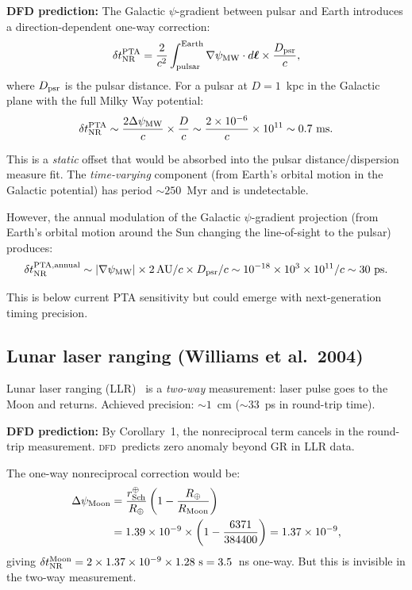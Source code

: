 \documentclass[aps,prl,twocolumn,superscriptaddress,showpacs]{revtex4-2}
\newcommand{\DFD}{\textsc{dfd}}
\newcommand{\Rearth}{R_\oplus}
\newcommand{\rSch}{r_{\rm Sch}}
\begin{document}
\textbf{DFD prediction:}  The Galactic $\psi$-gradient between
pulsar and Earth introduces a direction-dependent one-way correction:
\begin{equation}
\delta t_{\rm NR}^{\rm PTA} = \frac{2}{c^2}\int_{\rm pulsar}^{\rm Earth}
\nabla\psi_{\rm MW}\cdot d\boldsymbol{\ell}\times\frac{D_{\rm psr}}{c},
\end{equation}
where $D_{\rm psr}$ is the pulsar distance.  For a pulsar at
$D = 1$~kpc in the Galactic plane with the full Milky Way potential:
\begin{equation}
\delta t_{\rm NR}^{\rm PTA} \sim \frac{2\Delta\psi_{\rm MW}}{c}
\times \frac{D}{c} \sim \frac{2\times 10^{-6}}{c}\times 10^{11}
\sim 0.7~\text{ms}.
\end{equation}

This is a \emph{static} offset that would be absorbed into the
pulsar distance/dispersion measure fit.  The \emph{time-varying}
component (from Earth's orbital motion in the Galactic potential)
has period $\sim 250$~Myr and is undetectable.

However, the annual modulation of the Galactic $\psi$-gradient
projection (from Earth's orbital motion around the Sun changing
the line-of-sight to the pulsar) produces:
\begin{equation}
\delta t_{\rm NR}^{\rm PTA,annual} \sim |\nabla\psi_{\rm MW}|
\times 2\,\text{AU}/c \times D_{\rm psr}/c
\sim 10^{-18}\times 10^3\times 10^{11}/c \sim 30~\text{ps}.
\end{equation}

This is below current PTA sensitivity but could emerge with
next-generation timing precision.

\subsection{Lunar laser ranging (Williams et al.\ 2004)}

Lunar laser ranging (LLR)~\cite{Williams2004} is a \emph{two-way}
measurement: laser pulse goes to the Moon and returns.  Achieved
precision: $\sim 1$~cm ($\sim 33$~ps in round-trip time).

\textbf{DFD prediction:}  By Corollary~1, the nonreciprocal term
cancels in the round-trip measurement.  \DFD\ predicts zero
anomaly beyond GR in LLR data.

The one-way nonreciprocal correction would be:
\begin{align}
\Delta\psi_{\rm Moon} &= \frac{\rSch^\oplus}{\Rearth}
\left(1 - \frac{\Rearth}{R_{\rm Moon}}\right) \nonumber\\
&= 1.39\times 10^{-9}\times\left(1 - \frac{6371}{384400}\right)
= 1.37\times 10^{-9},
\end{align}
giving $\delta t_{\rm NR}^{\rm Moon} = 2\times 1.37\times 10^{-9}
\times 1.28\text{ s} = 3.5$~ns one-way.  But this is invisible
in the two-way measurement.
\end{document}

